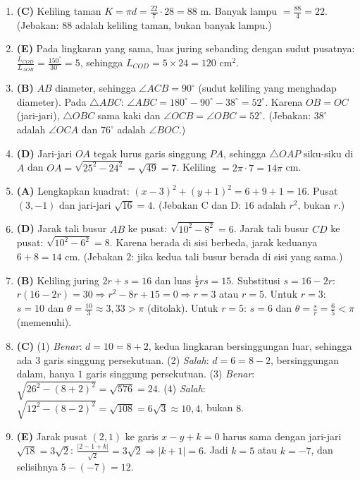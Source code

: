 \documentclass[a4paper,11pt]{article}
\newcommand{\dis}{\displaystyle}
\begin{document}
\small\begin{enumerate}[leftmargin=2em,itemsep=2pt,topsep=2pt]
\item[\textbf{1.}] \textbf{(C)} Keliling taman $K=\pi d=\dis\frac{22}{7}\cdot28=88$ m. Banyak lampu $=\dis\frac{88}{4}=22$. (Jebakan: $88$ adalah keliling taman, bukan banyak lampu.)
\item[\textbf{2.}] \textbf{(E)} Pada lingkaran yang sama, luas juring sebanding dengan sudut pusatnya: $\dis\frac{L_{COD}}{L_{AOB}}=\frac{150^\circ}{30^\circ}=5$, sehingga $L_{COD}=5\times24=120$ cm$^2$.
\item[\textbf{3.}] \textbf{(B)} $AB$ diameter, sehingga $\angle ACB=90^\circ$ (sudut keliling yang menghadap diameter). Pada $\triangle ABC$: $\angle ABC=180^\circ-90^\circ-38^\circ=52^\circ$. Karena $OB=OC$ (jari-jari), $\triangle OBC$ sama kaki dan $\angle OCB=\angle OBC=52^\circ$. (Jebakan: $38^\circ$ adalah $\angle OCA$ dan $76^\circ$ adalah $\angle BOC$.)
\item[\textbf{4.}] \textbf{(D)} Jari-jari $OA$ tegak lurus garis singgung $PA$, sehingga $\triangle OAP$ siku-siku di $A$ dan $OA=\sqrt{25^2-24^2}=\sqrt{49}=7$. Keliling $=2\pi\cdot7=14\pi$ cm.
\item[\textbf{5.}] \textbf{(A)} Lengkapkan kuadrat: $(x-3)^2+(y+1)^2=6+9+1=16$. Pusat $(3,-1)$ dan jari-jari $\sqrt{16}=4$. (Jebakan C dan D: $16$ adalah $r^2$, bukan $r$.)
\item[\textbf{6.}] \textbf{(D)} Jarak tali busur $AB$ ke pusat: $\sqrt{10^2-8^2}=6$. Jarak tali busur $CD$ ke pusat: $\sqrt{10^2-6^2}=8$. Karena berada di sisi berbeda, jarak keduanya $6+8=14$ cm. (Jebakan $2$: jika kedua tali busur berada di sisi yang sama.)
\item[\textbf{7.}] \textbf{(B)} Keliling juring $2r+s=16$ dan luas $\frac12rs=15$. Substitusi $s=16-2r$: $r(16-2r)=30\Rightarrow r^2-8r+15=0\Rightarrow r=3$ atau $r=5$. Untuk $r=3$: $s=10$ dan $\theta=\frac{10}{3}\approx3{,}33>\pi$ (ditolak). Untuk $r=5$: $s=6$ dan $\theta=\dis\frac{s}{r}=\frac65<\pi$ (memenuhi).
\item[\textbf{8.}] \textbf{(C)} (1) \emph{Benar}: $d=10=8+2$, kedua lingkaran bersinggungan luar, sehingga ada $3$ garis singgung persekutuan. (2) \emph{Salah}: $d=6=8-2$, bersinggungan dalam, hanya $1$ garis singgung persekutuan. (3) \emph{Benar}: $\sqrt{26^2-(8+2)^2}=\sqrt{576}=24$. (4) \emph{Salah}: $\sqrt{12^2-(8-2)^2}=\sqrt{108}=6\sqrt3\approx10{,}4$, bukan $8$.
\item[\textbf{9.}] \textbf{(E)} Jarak pusat $(2,1)$ ke garis $x-y+k=0$ harus sama dengan jari-jari $\sqrt{18}=3\sqrt2$: $\dis\frac{|2-1+k|}{\sqrt2}=3\sqrt2\Rightarrow|k+1|=6$. Jadi $k=5$ atau $k=-7$, dan selisihnya $5-(-7)=12$.

\end{enumerate}
\end{document}
